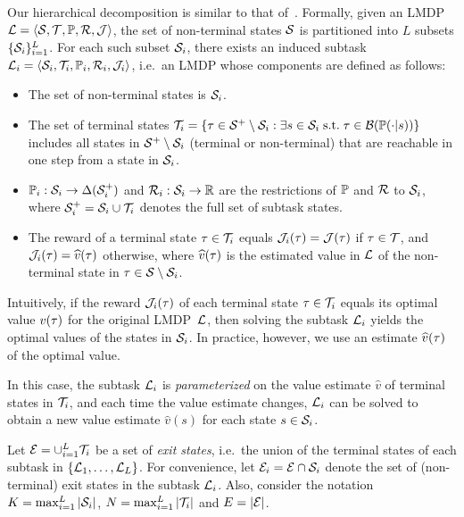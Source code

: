 Our hierarchical decomposition is similar to that of~\citep{Wen2020}. Formally, given an LMDP $\mathcal{L}=\langle\mathcal{S},\mathcal{T},\mathbb{P},\mathcal{R},\mathcal{J}\rangle$, the set of non-terminal states $\mathcal{S}$ is partitioned into $L$ subsets $\{\mathcal{S}_i\}_{i=1}^L$. For each such subset $\mathcal{S}_i$, there exists an induced subtask $\linebreak {\cL_i=\langle\cS_i,\cT_i,\kernel_i,\cR_i,\cJ_i\rangle}$, i.e.~an LMDP whose components are defined as follows:
\begin{itemize}
\item The set of non-terminal states is $\mathcal{S}_i$.
\item The set of terminal states $\mathcal{T}_i=\{\tau \in\mathcal{S}^+\setminus\mathcal{S}_i:\exists s\in \mathcal{S}_i \; \text{s.t.} \; \tau \in \mathcal{B}(\mathbb{P}(\cdot|s))\}$ includes all states in $\mathcal{S}^+\setminus\mathcal{S}_i$ (terminal or non-terminal) that are reachable in one step from a state in $\mathcal{S}_i$.
\item $\mathbb{P}_i:\mathcal{S}_i\rightarrow\Delta(\mathcal{S}_i^+)$ and $\mathcal{R}_i:\mathcal{S}_i\rightarrow\mathbb{R}$ are the restrictions of $\mathbb{P}$ and $\mathcal{R}$ to $\mathcal{S}_i$, where $\mathcal{S}_i^+=\mathcal{S}_i\cup\mathcal{T}_i$ denotes the full set of subtask states.
\item The reward of a terminal state $\tau \in\mathcal{T}_i$ equals $\mathcal{J}_i(\tau)=\mathcal{J}(\tau)$ if $\tau\in\mathcal{T}$, and $\mathcal{J}_i(\tau)=\widehat{v}(\tau)$ otherwise, where $\widehat{v}(\tau)$ is the estimated value in $\mathcal{L}$ of the non-terminal state in  $\tau\in\mathcal{S} \setminus \mathcal{S}_i$.
\end{itemize}

Intuitively, if the reward $\mathcal{J}_i(\tau)$ of each terminal state $\tau\in\mathcal{T}_i$ equals its optimal value $v(\tau)$ for the original LMDP~$\mathcal{L}$, then solving the subtask $\mathcal{L}_i$ yields the optimal values of the states in $\mathcal{S}_i$.
In practice, however, we use an estimate $\widehat{v}(\tau)$ of the optimal value.

In this case, the subtask $\mathcal{L}_i$ is {\em parameterized} on the value estimate $\widehat{v}$ of terminal states in $\mathcal{T}_i$, and each time the value estimate changes, $\mathcal{L}_i$ can be solved to obtain a new value estimate
$\widehat{v}(s)$ for each state $s\in\mathcal{S}_i$.



Let $\mathcal{E}=\cup_{i=1}^L\mathcal{T}_i$ be a set of {\em exit states}, i.e.~the union of the terminal states of each subtask in $\{\mathcal{L}_1,\ldots,\mathcal{L}_L\}$. For convenience, let $\mathcal{E}_i=\mathcal{E}\cap\mathcal{S}_i$ denote the set of (non-terminal) exit states in the subtask $\mathcal{L}_i$. Also, consider the notation $K=\max_{i=1}^L|\mathcal{S}_i|$, $N=\max_{i=1}^L|\mathcal{T}_i|$ and $E=|\mathcal{E}|$.

